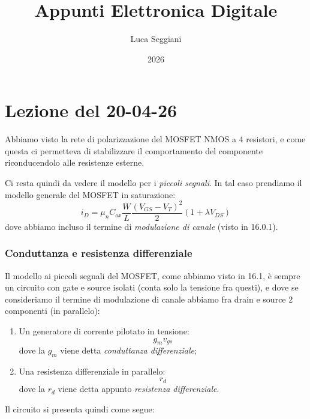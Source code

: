 \documentclass[a4paper,11pt]{article}
\title{Appunti Elettronica Digitale}
\author{Luca Seggiani}
\date{2026}
\begin{document}
\section{Lezione del 20-04-26}

\thispagestyle{empty}
\pagestyle{fancy}

Abbiamo visto la rete di polarizzazione del MOSFET NMOS a 4 resistori, e come questa ci permetteva di stabilizzare il comportamento del componente riconducendolo alle resistenze esterne. 

Ci resta quindi da vedere il modello per i \textit{piccoli segnali}.
In tal caso prendiamo il modello generale del MOSFET in saturazione:
$$
i_D = \mu_n C_{ox} \frac{W}{L} \frac{(V_{GS} - V_T)^2}{2} (1 + \lambda V_{DS})
$$
dove abbiamo incluso il termine di \textit{modulazione di canale} (visto in 16.0.1).

\subsubsection{Conduttanza e resistenza differenziale}
Il modello ai piccoli segnali del MOSFET, come abbiamo visto in 16.1, è sempre un circuito con gate e source isolati (conta solo la tensione fra questi), e dove se consideriamo il termine di modulazione di canale abbiamo fra drain e source 2 componenti (in parallelo):
\begin{enumerate}
	\item Un generatore di corrente pilotato in tensione:
		$$
		g_m v_{gs}
		$$
		dove la $g_m$ viene detta \textit{conduttanza differenziale};
	\item Una resistenza differenziale in parallelo:
		$$
		r_d
		$$
		dove la $r_d$ viene detta appunto \textit{resistenza differenziale}.
\end{enumerate}

\newpage

Il circuito si presenta quindi come segue:
\begin{center}
\end{center}
\end{document}

